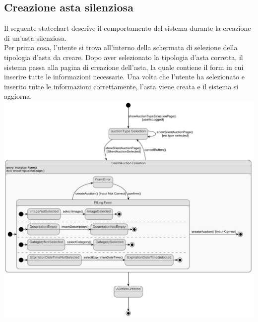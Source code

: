 \subsection{Creazione asta silenziosa}
Il seguente statechart descrive il comportamento del sistema durante la creazione di un'asta silenziosa. 
\\ Per prima cosa, l'utente si trova all'interno della schermata di selezione della tipologia d'asta da creare. 
Dopo aver selezionato la tipologia d'asta corretta, il sistema passa alla pagina di creazione dell'asta, la quale contiene il form in cui inserire tutte le informazioni necessarie. Una volta che l'utente ha selezionato e inserito tutte le informazioni correttamente, l'asta viene creata e il sistema si aggiorna. 
\\
\includegraphics[width=\textwidth]{assets/state_charts/creazione_asta_silenziosa.pdf}
\newpage

